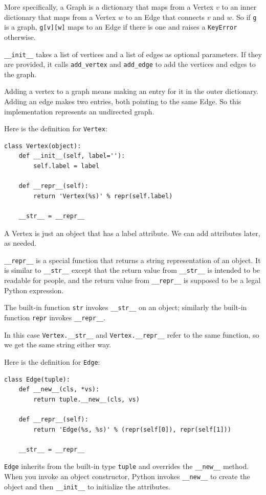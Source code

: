 \documentclass[10pt]{book}
\begin{document}
More specifically, a Graph is a dictionary that maps from
a Vertex $v$ to an inner dictionary that maps from a Vertex $w$
to an Edge that connects $v$ and $w$.  So if {\tt g} is a graph,
{\tt g[v][w]} maps to an Edge if there is one and raises
a {\tt KeyError} otherwise.

\verb"__init__" takes a list of vertices and a list of
edges as optional parameters.  If they are provided, it calls
\verb"add_vertex" and \verb"add_edge" to add the vertices and edges to
the graph.

Adding a vertex to a graph means making an entry for it in the
outer dictionary.  Adding an edge makes two entries, both pointing
to the same Edge.  So this implementation represents an undirected
graph.

Here is the definition for {\tt Vertex}:
%
\begin{verbatim}
class Vertex(object):
    def __init__(self, label=''):
        self.label = label

    def __repr__(self):
        return 'Vertex(%s)' % repr(self.label)

    __str__ = __repr__
\end{verbatim}
%
A Vertex is just an object that has a label attribute.  We can
add attributes later, as needed.

\verb"__repr__" is a special function that returns a string
representation of an object.  It is similar to \verb"__str__" except
that the return value from \verb"__str__" is intended to be readable
for people, and the return value from \verb"__repr__" is supposed to
be a legal Python expression.

The built-in function {\tt str} invokes \verb"__str__" on
an object; similarly the built-in function {\tt repr} invokes
\verb"__repr__".

In this case \verb"Vertex.__str__" and \verb"Vertex.__repr__" refer to
the same function, so we get the same string either way.

Here is the definition for {\tt Edge}:
%
\begin{verbatim}
class Edge(tuple):
    def __new__(cls, *vs):
        return tuple.__new__(cls, vs)

    def __repr__(self):
        return 'Edge(%s, %s)' % (repr(self[0]), repr(self[1]))

    __str__ = __repr__
\end{verbatim}
%
{\tt Edge} inherits from the built-in type {\tt tuple}
and overrides the \verb"__new__" method.  When you invoke
an object constructor, Python invokes \verb"__new__" to create
the object and then \verb"__init__" to initialize the attributes.
\end{document}
